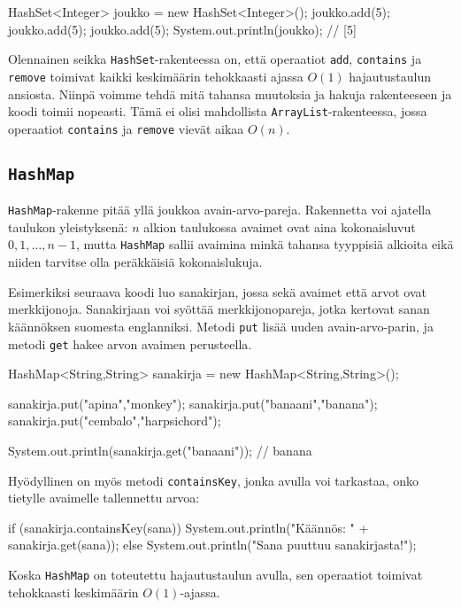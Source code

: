 \begin{code}
HashSet<Integer> joukko = new HashSet<Integer>();
joukko.add(5);
joukko.add(5);
joukko.add(5);
System.out.println(joukko); // [5]
\end{code}

Olennainen seikka \texttt{HashSet}-rakenteessa on,
että operaatiot \texttt{add}, \texttt{contains} ja \texttt{remove}
toimivat kaikki keskimäärin tehokkaasti ajassa $O(1)$
hajautustaulun ansiosta.
Niinpä voimme tehdä mitä tahansa muutoksia ja hakuja
rakenteeseen ja koodi toimii nopeasti.
Tämä ei olisi mahdollista \texttt{ArrayList}-rakenteessa,
jossa operaatiot \texttt{contains} ja \texttt{remove}
vievät aikaa $O(n)$.

\subsection{\texttt{HashMap}}

\texttt{HashMap}-rakenne pitää yllä joukkoa avain-arvo-pareja.
Rakennetta voi ajatella taulukon yleistyksenä:
$n$ alkion taulukossa avaimet ovat aina kokonaisluvut
$0,1,\ldots,n-1$, mutta \texttt{HashMap} sallii
avaimina minkä tahansa tyyppisiä alkioita eikä niiden
tarvitse olla peräkkäisiä kokonaislukuja.

Esimerkiksi seuraava koodi luo sanakirjan, jossa sekä
avaimet että arvot ovat merkkijonoja.
Sanakirjaan voi syöttää merkkijonopareja, jotka kertovat
sanan käännöksen suomesta englanniksi.
Metodi \texttt{put} lisää uuden avain-arvo-parin,
ja metodi \texttt{get} hakee arvon avaimen perusteella.

\begin{code}
HashMap<String,String> sanakirja = new HashMap<String,String>();

sanakirja.put("apina","monkey");
sanakirja.put("banaani","banana");
sanakirja.put("cembalo","harpsichord");

System.out.println(sanakirja.get("banaani")); // banana
\end{code}

Hyödyllinen on myös metodi \texttt{containsKey},
jonka avulla voi tarkastaa, onko tietylle avaimelle
tallennettu arvoa:

\begin{code}
if (sanakirja.containsKey(sana)) {
    System.out.println("Käännös: " + sanakirja.get(sana));
} else {
    System.out.println("Sana puuttuu sanakirjasta!");
}
\end{code}

Koska \texttt{HashMap} on toteutettu hajautustaulun avulla,
sen operaatiot toimivat tehokkaasti keskimäärin $O(1)$-ajassa.

